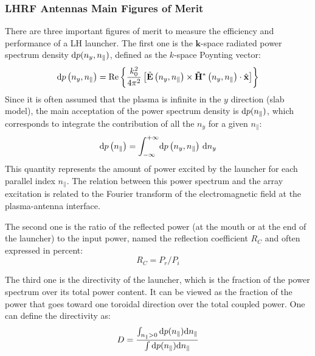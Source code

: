 \subsubsection{LHRF Antennas Main Figures of Merit}
There are three important figures of merit to measure the efficiency and
performance of a LH launcher. The first one is the $\mathbf{k}$-space radiated power spectrum density ${\mathrm{d}} p(n_y, n_\parallel)$, defined as the $k$-space Poynting vector:
\begin{equation} 
{\mathrm{d}} p
\left(n_{y},n_{\parallel}\right)
=\Re\left\{ \frac{k_{0}^{2}}{4\pi^{2}}
\left[\tilde{\mathbf{E}}
\left(n_{y},n_{\parallel}\right)
\times
\mathbf{\tilde{H}^{*}}\left(n_{y},n_{\parallel}\right)
\cdot\hat{{\mathbf x}}
\right]
\right\} 
\end{equation}
Since it is often assumed that the plasma is infinite in the $y$ direction (slab model), the main acceptation of the power spectrum density is ${\mathrm{d}} p(n_\parallel)$, which corresponds to integrate the contribution of all the $n_{y}$ for a given $n_{\parallel}$:
\begin{equation}
{\mathrm{d}} p\left(n_{\parallel}\right)=\int_{-\infty}^{+\infty}\! {\mathrm{d}} p\left(n_{y},n_{\parallel}\right)\, {\mathrm{d}} n_y
\end{equation}
This quantity represents the amount of power excited by the launcher for each parallel index $n_\parallel$. The relation between this power spectrum and the array excitation is related to the Fourier transform of the electromagnetic field at the plasma-antenna interface.

The second one is the ratio of the reflected power (at the mouth or at the end of the launcher) to the input power, named the reflection coefficient $R_C$ and often expressed in percent:
\begin{equation}
	R_C = P_r/P_i
\end{equation} 

The third one is the directivity of the launcher, which is the fraction of the power spectrum over its total power content. It can be viewed as the fraction of the power that goes toward one toroidal direction over the total coupled power. One can define the directivity as:
\begin{equation}
D = \frac{\int_{n_\parallel > 0}  {\mathrm{d}} p(n_\parallel) {\mathrm{d}} n_\parallel}{\int {\mathrm{d}} p(n_\parallel) {\mathrm{d}} n_\parallel} 
\end{equation}

